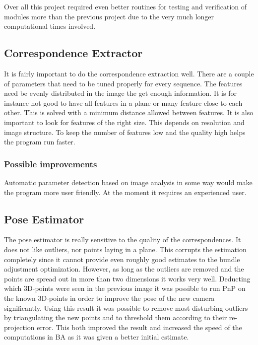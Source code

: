 Over all this project required even better routines for testing and verification of modules more than the previous project due to the very much longer computational times involved. 

\subsection{Correspondence Extractor}
It is fairly important to do the correspondence extraction well. There are a couple of parameters that need to be tuned properly for every sequence. The features need be evenly distributed in the image the get enough information. It is for instance not good to have all features in a plane or many feature close to each other. This is solved with a minimum distance allowed between features. It is also important to look for features of the right size. This depends on resolution and image structure. To keep the number of features low and the quality high helps the program run faster. 

\subsubsection{Possible improvements}
Automatic parameter detection based on image analysis in some way would make the program more user friendly. At the moment it requires an experienced user. 

\subsection{Pose Estimator}
The pose estimator is really sensitive to the quality of the correspondences. It does not like outliers, nor points laying in a plane. This corrupts the estimation completely since it cannot provide even roughly good estimates to the bundle adjustment optimization. However, as long as the outliers are removed and the points are spread out in more than two dimensions it works very well. Deducting which 3D-points were seen in the previous image it was possible to run PnP on the known 3D-points in order to improve the pose of the new camera significantly. Using this result it was possible to remove most disturbing outliers by triangulating the new points and to threshold them according to their re-projection error. This both improved the result and increased the speed of the computations in BA as it was given a better initial estimate.

